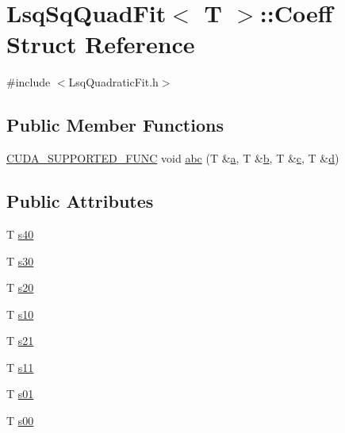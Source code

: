 \hypertarget{struct_lsq_sq_quad_fit_1_1_coeff}{}\section{Lsq\+Sq\+Quad\+Fit$<$ T $>$\+:\+:Coeff Struct Reference}
\label{struct_lsq_sq_quad_fit_1_1_coeff}


{\ttfamily \#include $<$Lsq\+Quadratic\+Fit.\+h$>$}

\subsection*{Public Member Functions}
\begin{DoxyCompactItemize}
\item 
\hyperlink{gpu__utils_8h_a69f41cb6c15f0e34b0889a5f6d5aae32}{C\+U\+D\+A\+\_\+\+S\+U\+P\+P\+O\+R\+T\+E\+D\+\_\+\+F\+U\+NC} void \hyperlink{struct_lsq_sq_quad_fit_1_1_coeff_a6b9f1b14627e0e6aa4e611ff9fba10dc}{abc} (T \&\hyperlink{class_lsq_sq_quad_fit_aed5761aec0a7a0f48c00668e07018f5f}{a}, T \&\hyperlink{class_lsq_sq_quad_fit_a2152e5451babc95de72e22235c506207}{b}, T \&\hyperlink{class_lsq_sq_quad_fit_a9339f928660fda5f1d67bbe93da0df5e}{c}, T \&\hyperlink{class_lsq_sq_quad_fit_a2fbec8bc8653a177da1f7d5db77a9c0a}{d})
\end{DoxyCompactItemize}
\subsection*{Public Attributes}
\begin{DoxyCompactItemize}
\item 
T \hyperlink{struct_lsq_sq_quad_fit_1_1_coeff_ae352321176113dcbe22edfb94cb0974a}{s40}
\item 
T \hyperlink{struct_lsq_sq_quad_fit_1_1_coeff_ac756c374b5be8c857aab50c63b025307}{s30}
\item 
T \hyperlink{struct_lsq_sq_quad_fit_1_1_coeff_a837251d5f164597eb5ff2759df1d8882}{s20}
\item 
T \hyperlink{struct_lsq_sq_quad_fit_1_1_coeff_a450e15b091158e154e6f7f935fbad006}{s10}
\item 
T \hyperlink{struct_lsq_sq_quad_fit_1_1_coeff_a91d41e9b15e90da177f5c5f245508723}{s21}
\item 
T \hyperlink{struct_lsq_sq_quad_fit_1_1_coeff_a50a6f1c130d5358398fb7cd01097fe03}{s11}
\item 
T \hyperlink{struct_lsq_sq_quad_fit_1_1_coeff_af9640f1f631cb95b9f5c689f2c92ed82}{s01}
\item 
T \hyperlink{struct_lsq_sq_quad_fit_1_1_coeff_a7197a54e45e95e5e09092555f147cbbe}{s00}
\end{DoxyCompactItemize}


